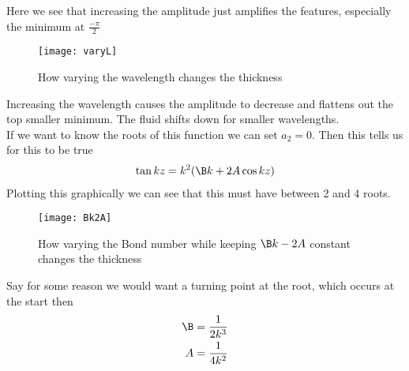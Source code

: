 \documentclass[12pt]{article}
\begin{document}
	Here we see that increasing the amplitude just amplifies the features, especially the minimum at $\frac{-\pi}{2}$
\begin{figure}[H]
	\centering
	\caption{How varying the wavelength changes the thickness}
	\texttt{[image: varyL]}
\end{figure}
Increasing the wavelength causes the amplitude to decrease and flattens out the top smaller minimum. The fluid shifts down for smaller wavelengths.\\
If we want to know the roots of this function we can set $a_2 = 0 $. Then this tells us for this to be true
\begin{align}
\tan kz  = k^2(\B k+2A \cos k z) 
\end{align}
Plotting this graphically we can see that this must have between 2 and 4 roots.
\begin{figure}[H]
	\centering
	\caption{How varying the Bond number while keeping $\B k-2A$ constant changes the thickness}
	\texttt{[image: Bk2A]}
\end{figure}

Say for some reason we would want a turning point at the root, which occurs at the start then \begin{align}
\B = \frac{1}{2k^3}\\
A=\frac{1}{4k^2}
\end{align}
\end{document}
